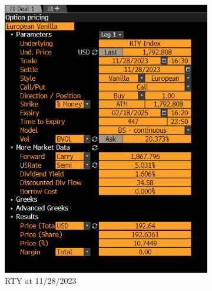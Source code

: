 \documentclass[12pt,a4paper]{article}
\begin{document}
\begin{enumerate}
\begin{figure}[H]
    \centering
    \begin{subfigure}{0.48\textwidth}
        \centering
        \includegraphics[width=\textwidth, height=0.4\textheight]{images_project_3/rty_div.png}
        \caption{RTY at 11/28/2023}
        \label{fig:rty_vol}
    \end{subfigure}
    \hfill
    \begin{subfigure}{0.48\textwidth}
        \centering

\end{subfigure}
\end{figure}
\end{enumerate}
\end{document}
